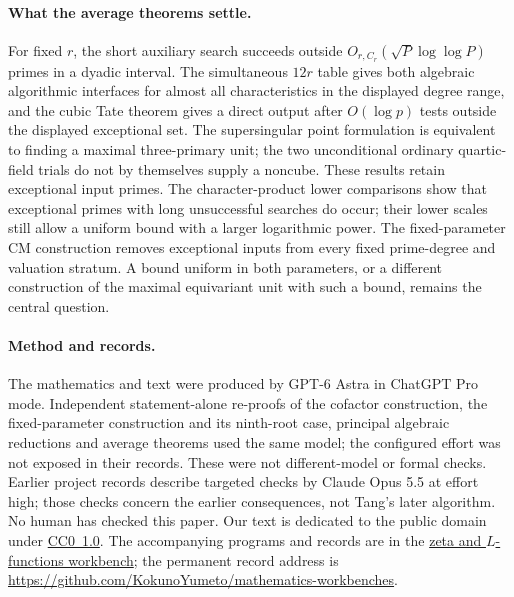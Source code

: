 \documentclass[11pt]{article}
\newcommand{\workbenchurl}{https://github.com/KokunoYumeto/zeta-and-l-functions-workbench}
\newcommand{\recordurl}{https://github.com/KokunoYumeto/mathematics-workbenches}
\theoremstyle{definition}
\theoremstyle{remark}
\begin{document}
\paragraph{What the average theorems settle.}
For fixed $r$, the short auxiliary search succeeds outside $O_{r,C_r}(\sqrt P\log\log P)$ primes in a dyadic interval. The simultaneous $12r$ table gives both algebraic algorithmic interfaces for almost all characteristics in the displayed degree range, and the cubic Tate theorem gives a direct output after $O(\log p)$ tests outside the displayed exceptional set. The supersingular point formulation is equivalent to finding a maximal three-primary unit; the two unconditional ordinary quartic-field trials do not by themselves supply a noncube. These results retain exceptional input primes. The character-product lower comparisons show that exceptional primes with long unsuccessful searches do occur; their lower scales still allow a uniform bound with a larger logarithmic power. The fixed-parameter CM construction removes exceptional inputs from every fixed prime-degree and valuation stratum. A bound uniform in both parameters, or a different construction of the maximal equivariant unit with such a bound, remains the central question.

\paragraph{Method and records.}
The mathematics and text were produced by GPT-6 Astra in ChatGPT Pro mode.
Independent statement-alone re-proofs of the cofactor construction, the fixed-parameter construction and its ninth-root case, principal algebraic reductions and average theorems used the same model; the configured effort was not exposed
in their records. These were not different-model or formal checks.  Earlier project records describe targeted checks
by Claude Opus 5.5 at effort high; those checks concern the earlier
consequences, not Tang's later algorithm.  No human has checked this paper.
Our text is dedicated to the public domain under
\href{https://creativecommons.org/publicdomain/zero/1.0/}{CC0~1.0}.
The accompanying programs and records are in the
\href{\workbenchurl}{zeta and $L$-functions workbench}; the permanent
record address is \url{\recordurl}.
\end{document}
